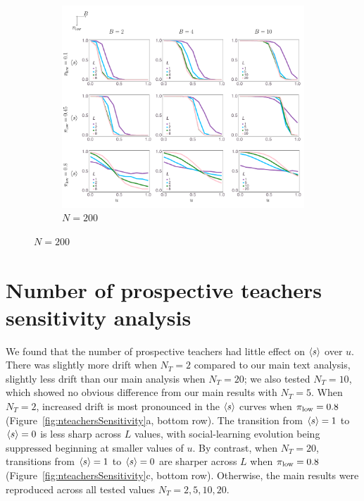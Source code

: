 \documentclass[letterpaper,11.5pt]{scrartcl}
\begin{document}
\begin{figure}
  \ContinuedFloat
	\begin{subfigure}{\textwidth}
	  \caption{$N=200$}
	  \includegraphics[width=\textwidth]{Figures/supplement/numagents=200/mainResultsPlots.pdf}
	\end{subfigure}
\end{figure}


\clearpage

\section{Number of prospective teachers sensitivity analysis}

We found that the number of prospective teachers had little effect on $\langle s \rangle$
over $u$. There was slightly more drift when $N_T = 2$ compared to our 
main text analysis, slightly less drift than our main analysis when $N_T = 20$; 
we also tested $N_T=10$, which showed no obvious difference from our main results
with $N_T = 5$. When $N_T = 2$, increased drift is most pronounced in the
$\langle s \rangle$ curves when $\pi_{\mathrm{low}}=0.8$ (Figure~\ref{fig:nteachersSensitivity}a, 
bottom row). The transition from $\langle s \rangle = 1$ to $\langle s \rangle = 0$ is less sharp
across $L$ values, with social-learning evolution being suppressed beginning
at smaller values of $u$. By contrast, when $N_T = 20$, transitions from 
$\langle s \rangle = 1$ to $\langle s \rangle = 0$ are sharper across $L$ when $\pi_{\mathrm{low}} = 0.8$
(Figure~\ref{fig:nteachersSensitivity}c, bottom row). Otherwise, the main 
results were reproduced across all tested values $N_T=2,5,10,20$.
\end{document}
